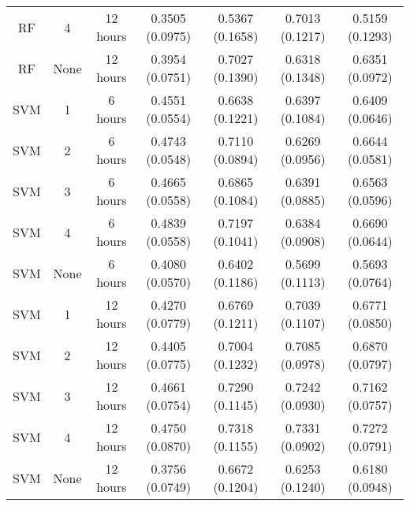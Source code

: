 \begin{tabular}{c|c|c|c|c|c|c}
RF & 4 & 12 hours & 0.3505 (0.0975) & 0.5367 (0.1658) & 0.7013 (0.1217) & 0.5159 (0.1293)\\
RF & None & 12 hours & 0.3954 (0.0751) & 0.7027 (0.1390) & 0.6318 (0.1348) & 0.6351 (0.0972)\\
SVM & 1 & 6 hours & 0.4551 (0.0554) & 0.6638 (0.1221) & 0.6397 (0.1084) & 0.6409 (0.0646)\\
SVM & 2 & 6 hours & 0.4743 (0.0548) & 0.7110 (0.0894) & 0.6269 (0.0956) & 0.6644 (0.0581)\\
SVM & 3 & 6 hours & 0.4665 (0.0558) & 0.6865 (0.1084) & 0.6391 (0.0885) & 0.6563 (0.0596)\\
SVM & 4 & 6 hours & 0.4839 (0.0558) & 0.7197 (0.1041) & 0.6384 (0.0908) & 0.6690 (0.0644)\\
SVM & None & 6 hours & 0.4080 (0.0570) & 0.6402 (0.1186) & 0.5699 (0.1113) & 0.5693 (0.0764)\\
SVM & 1 & 12 hours & 0.4270 (0.0779) & 0.6769 (0.1211) & 0.7039 (0.1107) & 0.6771 (0.0850)\\
SVM & 2 & 12 hours & 0.4405 (0.0775) & 0.7004 (0.1232) & 0.7085 (0.0978) & 0.6870 (0.0797)\\
SVM & 3 & 12 hours & 0.4661 (0.0754) & 0.7290 (0.1145) & 0.7242 (0.0930) & 0.7162 (0.0757)\\
SVM & 4 & 12 hours & 0.4750 (0.0870) & 0.7318 (0.1155) & 0.7331 (0.0902) & 0.7272 (0.0791)\\
SVM & None & 12 hours & 0.3756 (0.0749) & 0.6672 (0.1204) & 0.6253 (0.1240) & 0.6180 (0.0948)\\
\end{tabular} %